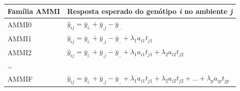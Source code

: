 \documentclass[
]{book}
\numberwithin{equation}{section}
\begin{document}
\begin{longtable}[]{@{}ll@{}}
\toprule
\begin{minipage}[b]{0.17\columnwidth}\raggedright
Família AMMI\strut
\end{minipage} & \begin{minipage}[b]{0.77\columnwidth}\raggedright
Resposta esperado do genótipo \emph{i} no ambiente \emph{j}\strut
\end{minipage}\tabularnewline
\midrule
\endhead
\begin{minipage}[t]{0.17\columnwidth}\raggedright
AMMI0\strut
\end{minipage} & \begin{minipage}[t]{0.77\columnwidth}\raggedright
\(\hat{y}_{ij} = \bar{y}_{i.} + \bar{y}_{.j} - \bar{y}_{..}\)\strut
\end{minipage}\tabularnewline
\begin{minipage}[t]{0.17\columnwidth}\raggedright
AMMI1\strut
\end{minipage} & \begin{minipage}[t]{0.77\columnwidth}\raggedright
\(\hat{y}_{ij} = \bar{y}_{i.} + \bar{y}_{.j} - \bar{y}_{..} +\lambda_1 a_{i1}t_{j1}\)\strut
\end{minipage}\tabularnewline
\begin{minipage}[t]{0.17\columnwidth}\raggedright
AMMI2\strut
\end{minipage} & \begin{minipage}[t]{0.77\columnwidth}\raggedright
\(\hat{y}_{ij} = \bar{y}_{i.} + \bar{y}_{.j} - \bar{y}_{..} +\lambda_1 a_{i1}t_{j1}+\lambda_2 a_{i2}t_{j2}\)\strut
\end{minipage}\tabularnewline
\begin{minipage}[t]{0.17\columnwidth}\raggedright
\ldots{}\strut
\end{minipage} & \begin{minipage}[t]{0.77\columnwidth}\raggedright
\strut
\end{minipage}\tabularnewline
\begin{minipage}[t]{0.17\columnwidth}\raggedright
AMMIF\strut
\end{minipage} & \begin{minipage}[t]{0.77\columnwidth}\raggedright
\(\hat{y}_{ij} = \bar{y}_{i.} + \bar{y}_{.j} - \bar{y}_{..} +\lambda_1 a_{i1}t_{j1}+\lambda_2 a_{i2}t_{j2}+...+\lambda_p a_{ip}t_{jp}\)\strut
\end{minipage}\tabularnewline
\bottomrule
\end{longtable}
\end{document}
